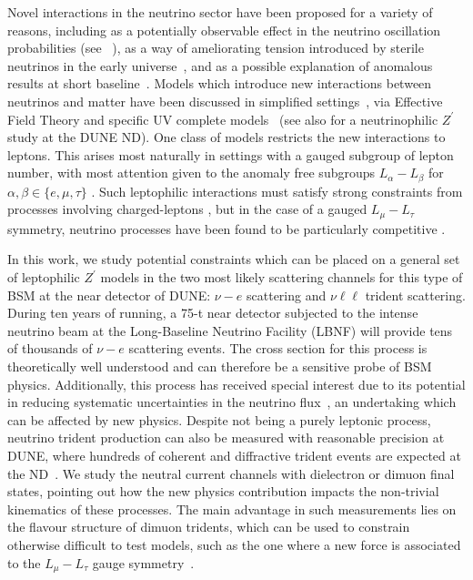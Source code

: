 Novel interactions in the neutrino sector have been proposed for a variety of reasons, including as a potentially observable effect in the neutrino oscillation probabilities (see \eg\ \cite{Blennow:2016jkn}), as a way of ameliorating tension introduced by sterile neutrinos in the early universe~\cite{Hannestad:2013ana, Dasgupta:2013zpn,Mirizzi:2014ama,Cherry:2016jol,Capozzi:2017auw,Denton:2018dqq,Chu:2018gxk,Esmaili:2018qzu}, and as a possible explanation of anomalous results at short baseline~\cite{Bertuzzo:2018itn,Ballett:2018ynz,Arguelles:2018mtc}. Models which introduce new interactions between neutrinos and matter have been discussed in simplified settings~\cite{Boehm:2004uq, Cerdeno:2016sfi,Denton:2018xmq}, via Effective Field Theory \cite{Falkowski:2018dmy,Falkowski:2019xoe} and specific UV complete models~\cite{Farzan:2015doa} (see also \cite{Bakhti:2018avv} for a neutrinophilic $Z^\prime$ study at the DUNE ND).
%
One class of models restricts the new interactions to leptons. This arises most naturally in settings with a gauged subgroup of lepton number, with most attention given to the anomaly free subgroups $L_\alpha - L_\beta$ for $\alpha,\beta \in \{e,\mu,\tau\}$ \cite{He:1991qd,He:1990pn}. Such leptophilic interactions must satisfy strong constraints from processes involving charged-leptons \cite{Bauer:2018onh}, but in the case of a gauged $L_\mu - L_\tau$ symmetry, neutrino processes have been found to be particularly competitive \cite{Altmannshofer2014}.

In this work, we study potential constraints which can be placed on a general set of leptophilic $Z^\prime$ models in the two most likely scattering channels for this type of BSM at the near detector of DUNE: $\nu-e$ scattering and $\nu\ell\ell$ trident scattering. During ten years of running, a 75-t near detector subjected to the intense neutrino beam at the Long-Baseline Neutrino Facility (LBNF) will provide tens of thousands of $\nu-e$ scattering events. The cross section for this process is theoretically well understood and can therefore be a sensitive probe of BSM physics. Additionally, this process has received special interest due to its potential in reducing systematic uncertainties in the neutrino flux~\cite{Park:2013dax,Bian:2017axs}, an undertaking which can be affected by new physics. Despite not being a purely leptonic process, neutrino trident production can also be measured with reasonable precision at DUNE, where hundreds of coherent and diffractive trident events are expected at the ND~\cite{Ballett:2018uuc}. We study the neutral current channels with dielectron or dimuon final states, pointing out how the new physics contribution impacts the non-trivial kinematics of these processes. The main advantage in such measurements lies on the flavour structure of dimuon tridents, which can be used to constrain otherwise difficult to test models, such as the one where a new force is associated to the $L_\mu-L_\tau$ gauge symmetry~\cite{Altmannshofer2014}.

